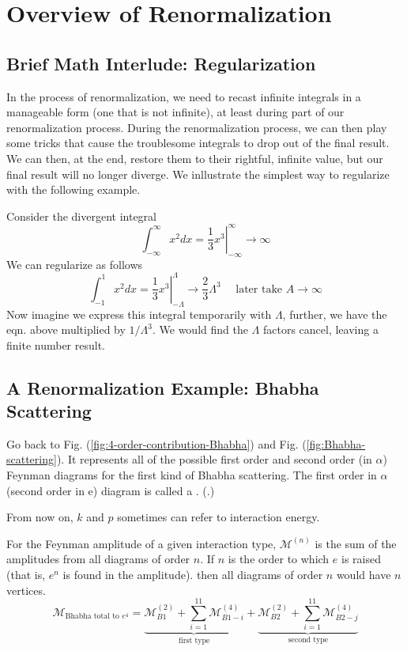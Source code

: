 \chapter{Overview of Renormalization}
\section{Brief Math Interlude: Regularization}
In the process of renormalization, we need to recast infinite integrals in a manageable form (one that is not infinite), at least during part of our renormalization process. During the renormalization process, we can then play some tricks that cause the troublesome integrals to drop out of the final result. We can then, at the end, restore them to their rightful, infinite value, but our final result will no longer diverge.  We inllustrate the simplest way to regularize with the following example.

Consider the divergent integral
$$\int_{-\infty}^{\infty} x^{2} d x=\left.\frac{1}{3} x^{3}\right|_{-\infty} ^{\infty} \rightarrow \infty$$
We can regularize as follows
$$\int_{-1}^{1} x^{2} d x=\left.\frac{1}{3} x^{3}\right|_{-\Lambda} ^{\Lambda} \rightarrow \frac{2}{3} \Lambda^{3}\quad \text {  later take } A \rightarrow \infty$$
Now imagine we express this integral temporarily with $\Lambda$, further, we have the eqn. above multiplied by $1/\Lambda^3$. We would find the $\Lambda$ factors cancel, leaving a finite number result.

\section{A Renormalization Example: Bhabha Scattering}
Go back to Fig. (\ref{fig:4-order-contribution-Bhabha}) and Fig. (\ref{fig:Bhabha-scattering}). It represents all of the possible first order and second order (in $\alpha$) Feynman diagrams for the first kind of Bhabha scattering. The first order in $\alpha$ (second order in e) diagram is called a \textbf{}. (.)
\begin{mybox}
From now on, $k$ and $p$ sometimes can refer to interaction energy.
\end{mybox}
For the Feynman amplitude of a given interaction type, $\mathcal{M}^{(n)}$ is the sum of the amplitudes from all diagrams of order $n .$ If $n$ is the order to which $e$ is raised (that is, $e^{n}$ is found in the amplitude). then all diagrams of order $n$ would have $n$ vertices.
\begin{equation}\mathcal{M}_{\text {Bhabha total to  }e^4}=\underbrace{\mathcal{M}_{B 1}^{(2)}+\sum_{i=1}^{11} \mathcal{M}_{B 1-i}^{(4)}}_{\text{first type}}+\underbrace{\mathcal{M}_{B 2}^{(2)}+\sum_{i=1}^{11} \mathcal{M}_{B 2-j}^{(4)}}_{\text{second type}}\end{equation}

